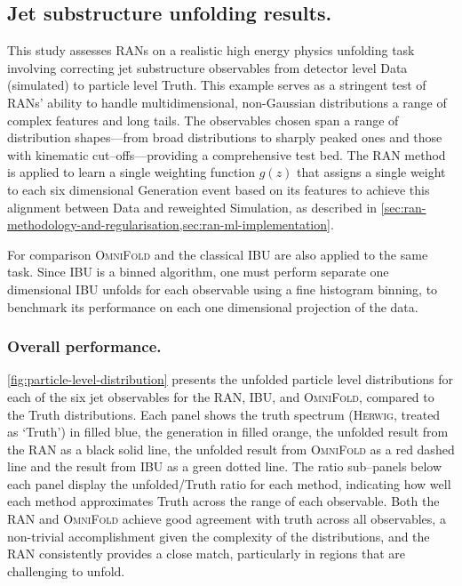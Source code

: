 {{    \subsection{Jet substructure unfolding results.}
        This study assesses RANs on a realistic high energy physics unfolding task involving correcting jet substructure observables from detector level Data (simulated) to particle level Truth.
        This example serves as a stringent test of RANs' ability to handle multidimensional, non-Gaussian distributions a range of complex features and long tails.
        The observables chosen span a range of distribution shapes---from broad distributions to sharply peaked ones and those with kinematic cut--offs---providing a comprehensive test bed.
        The RAN method is applied to learn a single weighting function $g(z)$ that assigns a single weight to each six dimensional Generation event based on its features to achieve this alignment between Data and reweighted Simulation, as described in \cref{sec:ran-methodology-and-regularisation,sec:ran-ml-implementation}.
        
        For comparison \textsc{OmniFold} and the classical IBU are also applied to the same task.
        Since IBU is a binned algorithm, one must perform separate one dimensional IBU unfolds for each observable using a fine histogram binning, to benchmark its performance on each one dimensional projection of the data.

\subsubsection{Overall performance.}

\cref{fig:particle-level-distribution} presents the unfolded particle level distributions for each of the six jet observables for the RAN, IBU, and \textsc{OmniFold}, compared to the Truth distributions.
            Each panel shows the truth spectrum (\textsc{Herwig}, treated as `Truth') in filled blue, the generation in filled orange, the unfolded result from the RAN as a black solid line, the unfolded result from \textsc{OmniFold} as a red dashed line and the result from IBU as a green dotted line.
            The ratio sub--panels below each panel display the unfolded/Truth ratio for each method, indicating how well each method approximates Truth across the range of each observable.
            Both the RAN and \textsc{OmniFold} achieve good agreement with truth across all observables, a non-trivial accomplishment given the complexity of the distributions, and the RAN consistently provides a close match, particularly in regions that are challenging to unfold.

}}
